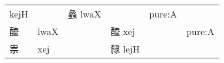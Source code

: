 \documentclass[14pt,a4paper]{scrartcl}
\begin{document}
\begin{longtable}[c]{@{}llllll@{}}
\begin{minipage}[t]{0.14\columnwidth}
kejH
\strut\end{minipage} &
\begin{minipage}[t]{0.14\columnwidth}\raggedright\strut
\strut\end{minipage} &
\begin{minipage}[t]{0.14\columnwidth}\raggedright\strut
蠡 lwaX
\strut\end{minipage} &
\begin{minipage}[t]{0.14\columnwidth}\raggedright\strut
\strut\end{minipage} &
\begin{minipage}[t]{0.14\columnwidth}\raggedright\strut
pure:A
\strut\end{minipage}\tabularnewline
\begin{minipage}[t]{0.14\columnwidth}\raggedright\strut
醯
\strut\end{minipage} &
\begin{minipage}[t]{0.14\columnwidth}\raggedright\strut
lwaX
\strut\end{minipage} &
\begin{minipage}[t]{0.14\columnwidth}\raggedright\strut
\strut\end{minipage} &
\begin{minipage}[t]{0.14\columnwidth}\raggedright\strut
醯 xej
\strut\end{minipage} &
\begin{minipage}[t]{0.14\columnwidth}\raggedright\strut
\strut\end{minipage} &
\begin{minipage}[t]{0.14\columnwidth}\raggedright\strut
pure:A
\strut\end{minipage}\tabularnewline
\begin{minipage}[t]{0.14\columnwidth}\raggedright\strut
祟
\strut\end{minipage} &
\begin{minipage}[t]{0.14\columnwidth}\raggedright\strut
xej
\strut\end{minipage} &
\begin{minipage}[t]{0.14\columnwidth}\raggedright\strut
\strut\end{minipage} &
\begin{minipage}[t]{0.14\columnwidth}\raggedright\strut
隸 lejH
\strut\end{minipage} &
\begin{minipage}[t]{0.14\columnwidth}\raggedright\strut
\strut\end{minipage} &
\begin{minipage}[t]{0.14\columnwidth}\raggedright\strut

\end{minipage}
\end{longtable}
\end{document}
